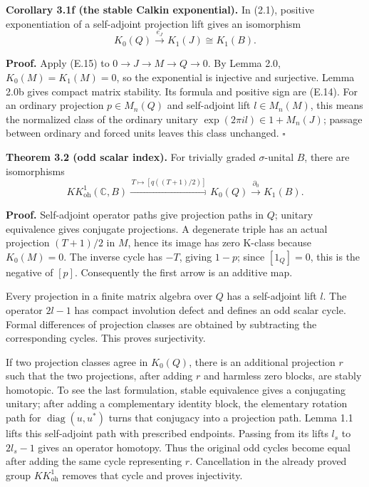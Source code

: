 \documentclass[
  11pt,
]{article}
\begin{document}
\textbf{Corollary 3.1f (the stable Calkin exponential).} In (2.1),
positive exponentiation of a self-adjoint projection lift gives an
isomorphism \[
K_0(Q)\xrightarrow{\ e_J\ }K_1(J)\cong K_1(B).
\tag{E.17}
\]

\textbf{Proof.} Apply (E.15) to \(0\to J\to M\to Q\to0\). By Lemma 2.0,
\(K_0(M)=K_1(M)=0\), so the exponential is injective and surjective.
Lemma 2.0b gives compact matrix stability. Its formula and positive sign
are (E.14). For an ordinary projection \(p\in M_n(Q)\) and self-adjoint
lift \(l\in M_n(M)\), this means the normalized class of the ordinary
unitary \(\exp(2\pi i l)\in1+M_n(J)\); passage between ordinary and
forced units leaves this class unchanged. \(\square\)

\textbf{Theorem 3.2 (odd scalar index).} For trivially graded
\(\sigma\)-unital \(B\), there are isomorphisms \[
KK^1_{\mathrm{oh}}(\mathbb C,B)
\xrightarrow{\,T\mapsto[q((T+1)/2)]\,}K_0(Q)
\xrightarrow{\partial_0}K_1(B).
\tag{3.4}
\]

\textbf{Proof.} Self-adjoint operator paths give projection paths in
\(Q\); unitary equivalence gives conjugate projections. A degenerate
triple has an actual projection \((T+1)/2\) in \(M\), hence its image
has zero K-class because \(K_0(M)=0\). The inverse cycle has \(-T\),
giving \(1-p\); since \([1_Q]=0\), this is the negative of \([p]\).
Consequently the first arrow is an additive map.

Every projection in a finite matrix algebra over \(Q\) has a
self-adjoint lift \(l\). The operator \(2l-1\) has compact involution
defect and defines an odd scalar cycle. Formal differences of projection
classes are obtained by subtracting the corresponding cycles. This
proves surjectivity.

If two projection classes agree in \(K_0(Q)\), there is an additional
projection \(r\) such that the two projections, after adding \(r\) and
harmless zero blocks, are stably homotopic. To see the last formulation,
stable equivalence gives a conjugating unitary; after adding a
complementary identity block, the elementary rotation path for
\(\operatorname{diag}(u,u^*)\) turns that conjugacy into a projection
path. Lemma 1.1 lifts this self-adjoint path with prescribed endpoints.
Passing from its lifts \(l_s\) to \(2l_s-1\) gives an operator homotopy.
Thus the original odd cycles become equal after adding the same cycle
representing \(r\). Cancellation in the already proved group
\(KK^1_{\mathrm{oh}}\) removes that cycle and proves injectivity.
\end{document}
